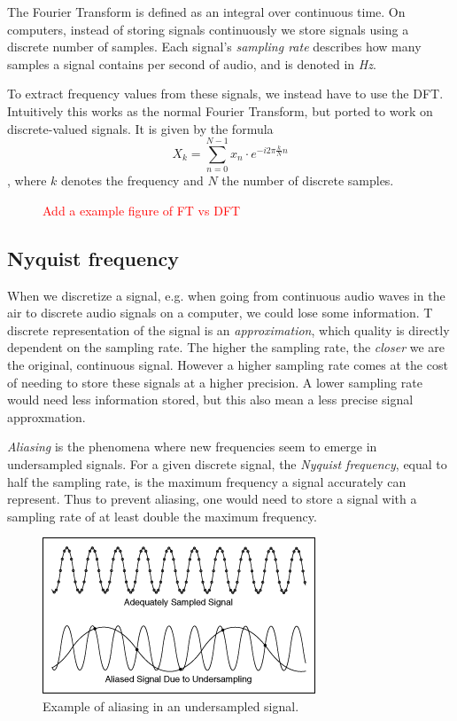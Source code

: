 The Fourier Transform is defined as an integral over continuous time. On computers, instead of storing signals continuously we store signals using a discrete number of samples. Each signal's \textit{sampling rate} describes how many samples a signal contains per second of audio, and is denoted in \textit{Hz}.

To extract frequency values from these signals, we instead have to use the \gls{DFT}. Intuitively this works as the normal Fourier Transform, but ported to work on discrete-valued signals. It is given by the formula $$ X_k = \sum^{N - 1}_{n=0}{x_n \cdot e^{-i 2\pi \frac{k}{N} n}} $$, where $k$ denotes the frequency and $N$ the number of discrete samples.

\begin{figure}[H]
    \centering
    \textcolor{red}{Add a example figure of FT vs DFT}
\end{figure}

\subsection{Nyquist frequency}

When we discretize a signal, e.g. when going from continuous audio waves in the air to discrete audio signals on a computer, we could lose some information. T discrete representation of the signal is an \textit{approximation}, which quality is directly dependent on the sampling rate. The higher the sampling rate, the \textit{closer} we are the original, continuous signal. However a higher sampling rate comes at the cost of needing to store these signals at a higher precision. A lower sampling rate would need less information stored, but this also mean a less precise signal approxmation.

\textit{Aliasing} is the phenomena where new frequencies seem to emerge in undersampled signals. For a given discrete signal, the \textit{Nyquist frequency}, equal to half the sampling rate, is the maximum frequency a signal accurately can represent. Thus to prevent aliasing, one would need to store a signal with a sampling rate of at least double the maximum frequency.

\begin{figure}[H]
    \centering
    \includegraphics[scale=2.0]{figures/signalaliasing.png}
    \caption{Example of aliasing in an undersampled signal.}
    \label{AliasingFigure}
\end{figure}

